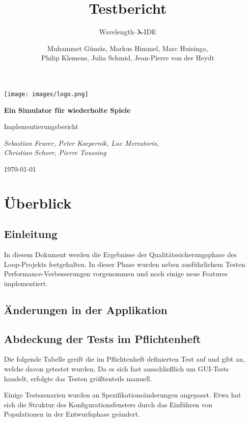 \documentclass[parskip=full,11pt,openany]{scrreprt}
\title{Testbericht}
\subtitle{Wavelength--$\bm{\lambda}$-IDE}
\author{Muhammet Gümüs, Markus Himmel, Marc Huisinga,\\Philip Klemens, Julia Schmid, Jean-Pierre von der Heydt}
\begin{document}
\begin{titlepage}
	\centering
	\vspace*{5cm}
	\texttt{[image: images/logo.png]}\par
	{\huge\bfseries Ein Simulator für wiederholte Spiele\par}
	{\Large Implementierungsbericht\par}
	\vspace{2cm}
	{\Large\itshape Sebastian Feurer, Peter Koepernik, Luc Mercatoris,\\Christian Schorr, Pierre Toussing\par}
	\vfill
	{\large \today\par}
\end{titlepage}

\tableofcontents
\pagebreak

\chapter{Überblick}

\section{Einleitung}

In diesem Dokument werden die Ergebnisse der Qualitätssicherungsphase des Loop-Projekts festgehalten.
In dieser Phase wurden neben ausführlichem Testen Performance-Verbesserungen vorgenommen und noch einige neue Features implementiert.

\section{Änderungen in der Applikation}


\section{Abdeckung der Tests im Pflichtenheft}

Die folgende Tabelle greift die im Pflichtenheft definierten Test auf und gibt an, welche davon getestet wurden. Da es sich fast ausschließlich um GUI-Tests handelt, erfolgte das Testen größtenteils manuell.

Einige Testszenarien wurden an Spezifikationsänderungen angepasst. Etwa hat sich die Struktur des Konfigurationsfensters durch das Einführen von Populationen in der Entwurfsphase geändert.
\end{document}
